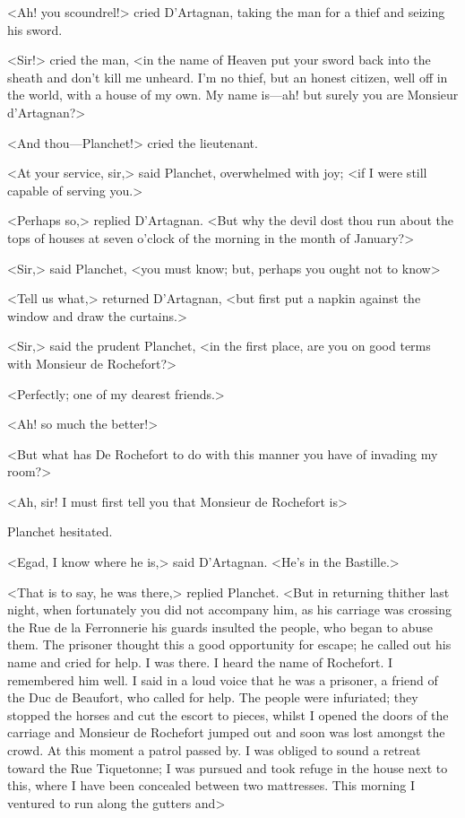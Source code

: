 <Ah! you scoundrel!> cried D'Artagnan, taking the man for a thief and seizing his sword.

<Sir!> cried the man, <in the name of Heaven put your sword back into the sheath and don't kill me unheard. I'm no thief, but an honest citizen, well off in the world, with a house of my own. My name is—ah! but surely you are Monsieur d'Artagnan?>

<And thou—Planchet!> cried the lieutenant.

<At your service, sir,> said Planchet, overwhelmed with joy; <if I were still capable of serving you.>

<Perhaps so,> replied D'Artagnan. <But why the devil dost thou run about the tops of houses at seven o'clock of the morning in the month of January?>

<Sir,> said Planchet, <you must know; but, perhaps you ought not to know\longdash>

<Tell us what,> returned D'Artagnan, <but first put a napkin against the window and draw the curtains.>

<Sir,> said the prudent Planchet, <in the first place, are you on good terms with Monsieur de Rochefort?>

<Perfectly; one of my dearest friends.>

<Ah! so much the better!>

<But what has De Rochefort to do with this manner you have of invading my room?>

<Ah, sir! I must first tell you that Monsieur de Rochefort is\longdash>

Planchet hesitated.

<Egad, I know where he is,> said D'Artagnan. <He's in the Bastille.>

<That is to say, he was there,> replied Planchet. <But in returning thither last night, when fortunately you did not accompany him, as his carriage was crossing the Rue de la Ferronnerie his guards insulted the people, who began to abuse them. The prisoner thought this a good opportunity for escape; he called out his name and cried for help. I was there. I heard the name of Rochefort. I remembered him well. I said in a loud voice that he was a prisoner, a friend of the Duc de Beaufort, who called for help. The people were infuriated; they stopped the horses and cut the escort to pieces, whilst I opened the doors of the carriage and Monsieur de Rochefort jumped out and soon was lost amongst the crowd. At this moment a patrol passed by. I was obliged to sound a retreat toward the Rue Tiquetonne; I was pursued and took refuge in the house next to this, where I have been concealed between two mattresses. This morning I ventured to run along the gutters and\longdash>

